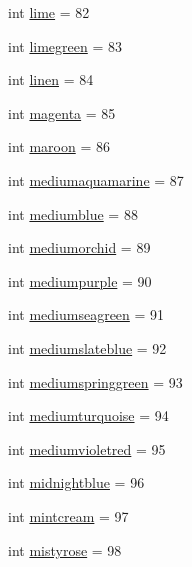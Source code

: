 \begin{DoxyCompactItemize}
int \hyperlink{classbridges_1_1named__color_1_1_named_color_a72bdae0466fe60c6687e920e905ac7e8}{lime} = 82
\item 
int \hyperlink{classbridges_1_1named__color_1_1_named_color_ac414217e1d9dfe3644845708f1f701e1}{limegreen} = 83
\item 
int \hyperlink{classbridges_1_1named__color_1_1_named_color_af7e23db411aa5784ea66e44a230c17d0}{linen} = 84
\item 
int \hyperlink{classbridges_1_1named__color_1_1_named_color_a7a9a5819c288f4b93f983472e71a2630}{magenta} = 85
\item 
int \hyperlink{classbridges_1_1named__color_1_1_named_color_a13fe4a1b9f9afcbf82810fb83a478c0c}{maroon} = 86
\item 
int \hyperlink{classbridges_1_1named__color_1_1_named_color_a77a4ef04ba8631b371668f11755ce950}{mediumaquamarine} = 87
\item 
int \hyperlink{classbridges_1_1named__color_1_1_named_color_a981fe35ca8dbd04e631ed9047aa148f6}{mediumblue} = 88
\item 
int \hyperlink{classbridges_1_1named__color_1_1_named_color_a1bfe636c37b062be9f6da68b7ae5da44}{mediumorchid} = 89
\item 
int \hyperlink{classbridges_1_1named__color_1_1_named_color_af5c5240bb83753576efd92ae13b15b95}{mediumpurple} = 90
\item 
int \hyperlink{classbridges_1_1named__color_1_1_named_color_a60f8895f1c6b01193331fb1e5196c8b9}{mediumseagreen} = 91
\item 
int \hyperlink{classbridges_1_1named__color_1_1_named_color_acffca3e69457a52a612d827608a44c13}{mediumslateblue} = 92
\item 
int \hyperlink{classbridges_1_1named__color_1_1_named_color_a50e9b6dd7d58a4f56ac8762dabeb1f3b}{mediumspringgreen} = 93
\item 
int \hyperlink{classbridges_1_1named__color_1_1_named_color_a0f68a5e6469f8677a621e8110a1cec2a}{mediumturquoise} = 94
\item 
int \hyperlink{classbridges_1_1named__color_1_1_named_color_a3ff6be6aa4fb327eaee5316cfb83ca0c}{mediumvioletred} = 95
\item 
int \hyperlink{classbridges_1_1named__color_1_1_named_color_a729f958e9af5c0f4d57c54f4058f985f}{midnightblue} = 96
\item 
int \hyperlink{classbridges_1_1named__color_1_1_named_color_ae95d108bfe71ea54f5b1d8ed858d4448}{mintcream} = 97
\item 
int \hyperlink{classbridges_1_1named__color_1_1_named_color_a364bbb1ccb1306ae658c9c64f9565a2d}{mistyrose} = 98

\end{DoxyCompactItemize}
